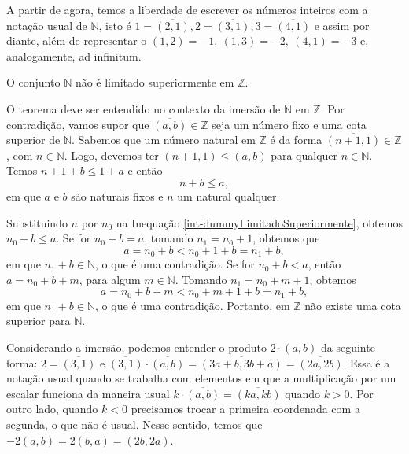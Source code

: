 \documentclass[../main.tex]{subfiles}
\begin{document}
\begin{obs}
    A partir de agora, temos a liberdade de escrever os números inteiros com a notação usual de $\mathbb{N}$, isto é $1 = \overline{(2,1)}, 2 = \overline{(3,1)}, 3 = \overline{(4,1)}$ e assim por diante, além de representar o $\overline{(1,2)} = -1,\ \overline{(1,3)} = -2,\ \overline{(4,1)} = -3$ e, analogamente, ad infinitum.
\end{obs}

\begin{teo}\label{int-teo-ilimitadoSuperiormente}
    O conjunto $\mathbb{N}$ não é limitado superiormente em $\mathbb{Z}$.
\end{teo}
\begin{dem}
    O teorema deve ser entendido no contexto da imersão de $\mathbb{N}$ em $\mathbb{Z}$.
    Por contradição, vamos supor que $\overline{(a,b)} \in \mathbb{Z}$ seja um número fixo e uma cota superior de $\mathbb{N}$. Sabemos que um número natural em $\mathbb{Z}$ é da forma $\overline{(n+1,1)} \in \mathbb{Z}$, com $n \in \mathbb{N}$. Logo, devemos ter $\overline{(n+1,1)} \leq \overline{(a,b)}$ para qualquer $n \in \mathbb{N}$. Temos $n+1+b \leq 1+a$ e então
    \begin{equation}
        n+b \leq a, \label{int-dummyIlimitadoSuperiormente}     
    \end{equation}
    em que $a$ e $b$ são naturais fixos e $n$ um natural qualquer.
    
    Substituindo $n$ por $n_0$ na Inequação \ref{int-dummyIlimitadoSuperiormente}, obtemos $n_0 + b \leq a$. Se for $n_0 + b = a$, tomando $n_1 = n_0 + 1$, obtemos que 
    \[ a = n_0 + b < n_0 + 1 + b =  n_1 + b, \] 
    em que $n_1 + b \in \mathbb{N}$, o que é uma contradição. Se for 
    $n_0 + b < a$, então $a = n_0 + b + m$, para algum $m \in \mathbb{N}$. Tomando $n_1 = n_0 + m + 1$, obtemos 
    \[ a = n_0 + b + m < n_0+m+1 + b = n_1 + b, \] 
    em que $n_1 + b \in \mathbb{N}$, o que é uma contradição. Portanto, em $\mathbb{Z}$ não existe uma cota superior para $\mathbb{N}$.

\end{dem}

\begin{ex}\label{int-ex-imersaoProduto}
    Considerando a imersão, podemos entender o produto $2 \cdot \overline{(a,b)}$ da seguinte forma:
    $2 = \overline{(3,1)}$ e $\overline{(3,1)} \cdot \overline{(a,b)} = \overline{(3a+b,3b+a)} = \overline{(2a,2b)}$.
    Essa é a notação usual quando se trabalha com elementos em que a multiplicação por um escalar funciona da maneira usual 
    $k \cdot \overline{(a,b)} = \overline{(ka,kb)}$ quando $k > 0$. Por outro lado, quando $k < 0$ precisamos trocar a primeira coordenada com a segunda, o que não é usual. Nesse sentido, temos que $-2\overline{(a,b)} = 2\overline{(b,a)} = \overline{(2b,2a)}$.
\end{ex}
\end{document}
